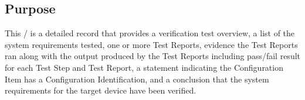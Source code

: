\subsection{Purpose}
This \stdRptPkg/ is a detailed record that provides a verification test
overview, a list of the system requirements tested, one or more Test
Reports, evidence the Test Reports ran along with the output produced by
the Test Reports including pass/fail result for each Test Step and
Test Report, a statement indicating the Configuration Item has a
Configuration Identification, and a conclusion that the system requirements
for the target device have been verified.

